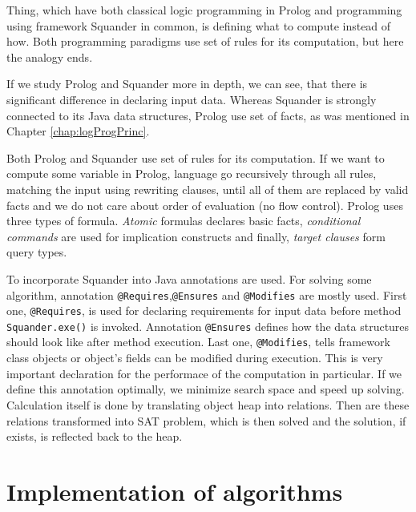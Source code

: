 \documentclass[11pt,twoside,a4paper]{book}
\begin{document}
Thing, which have both classical logic programming in Prolog and
programming using framework Squander in common, is defining what to compute
instead of how. Both programming paradigms use set of rules for its computation,
but here the analogy ends.

If we study Prolog and Squander more in depth, we can see, that there is
significant difference in declaring input data. Whereas Squander is strongly
connected to its Java data structures, Prolog use set of facts, as was
mentioned in Chapter \ref{chap:logProgPrinc}.


Both Prolog and Squander use set of rules for its computation. If we want to
compute some variable in Prolog, language go recursively through all rules,
matching the input using rewriting clauses, until all of them are replaced by
valid facts and we do not care about order of evaluation (no flow control).
Prolog uses three types of formula. \textit{Atomic} formulas declares basic
facts, \textit{conditional commands} are used for implication constructs and
finally, \textit{target clauses} form query types.


To incorporate Squander into Java annotations are used. For solving some
algorithm, annotation \verb|@Requires|,\verb|@Ensures| and \verb|@Modifies| are
mostly used. First one, \verb|@Requires|, is used for declaring requirements for
input data before method \verb|Squander.exe()| is invoked. Annotation
\verb|@Ensures| defines how the data structures should look like after method
execution. Last one, \verb|@Modifies|, tells framework class objects or object's
fields can be modified during execution. This is very important declaration
for the performace of the computation in particular. If we define this
annotation optimally, we minimize search space and speed up solving. Calculation
itself is done by translating object heap into relations. Then are these
relations transformed into SAT problem, which is then solved and the solution,
if exists, is reflected back to the heap.
\chapter{Implementation of algorithms}
\end{document}
